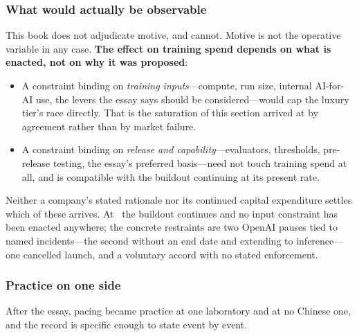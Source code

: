 \subsubsection*{What would actually be observable}

This book does not adjudicate motive, and cannot. Motive is not the operative variable in any case. \textbf{The effect on training spend depends on what is enacted, not on why it was proposed}:
\begin{itemize}\itemsep2pt
  \item A constraint binding on \emph{training inputs}---compute, run size, internal AI-for-AI use, the levers the essay says should be considered---would cap the luxury tier's race directly. That is the saturation of this section arrived at by agreement rather than by market failure.
  \item A constraint binding on \emph{release and capability}---evaluators, thresholds, pre-release testing, the essay's preferred basis---need not touch training spend at all, and is compatible with the buildout continuing at its present rate.
\end{itemize}
Neither a company's stated rationale nor its continued capital expenditure settles which of these arrives. At \datafreeze\ the buildout continues and no input constraint has been enacted anywhere; the concrete restraints are two OpenAI pauses tied to named incidents---the second without an end date and extending to inference---one cancelled launch, and a voluntary accord with no stated enforcement.

\subsubsection*{Practice on one side}

After the essay, pacing became practice at one laboratory and at no Chinese one, and the record is specific enough to state event by event.


